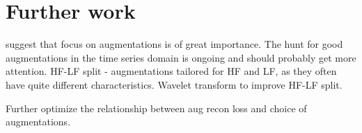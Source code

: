 \documentclass[../../thesis.tex]{subfiles}
\begin{document}
\section{Further work}

\cite{morningstar2024augmentations} suggest that focus on augmentations is of great importance. The hunt for good augmentations in the time series domain is ongoing and should probably get more attention.\newline
HF-LF split - augmentations tailored for HF and LF, as they often have quite different characteristics.\newline
Wavelet transform to improve HF-LF split.\newline

Further optimize the relationship between aug recon loss and choice of augmentations.\newline
\end{document}
